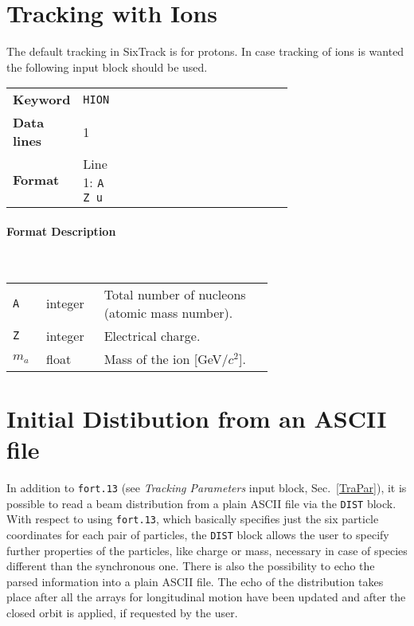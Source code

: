 \section{Tracking with Ions} \label{hions}
The default tracking in SixTrack is for protons. In case tracking of ions is wanted the following input block should be used.

\bigskip
\begin{tabular}{@{}llp{0.7\linewidth}}
    \textbf{Keyword}    & \texttt{HION}\index{HION} \\
    \textbf{Data lines} & 1 \\
    \textbf{Format}     & Line 1: \texttt{A Z u}
\end{tabular}

\paragraph{Format Description}~

\bigskip
\begin{longtabu}{@{}llp{0.65\linewidth}}
    \texttt{A}   & integer & Total number of nucleons (atomic mass number). \\
    \texttt{Z}   & integer & Electrical charge. \\
    \texttt{$m_a$}   & float   & Mass of the ion [GeV/$c^2$]. 
\end{longtabu}

\section{Initial Distibution from an ASCII file} \label{distBlock}
In addition to \texttt{fort.13} (see \emph{Tracking Parameters} input block, Sec.~\ref{TraPar}), it is possible to read a beam distribution from a plain ASCII file via the \texttt{DIST} block.
With respect to using \texttt{fort.13}, which basically specifies just the six particle coordinates for each pair of particles, the \texttt{DIST} block allows the user to specify further properties of the particles, like charge or mass, necessary in case of species different than the synchronous one.
There is also the possibility to echo the parsed information into a plain ASCII file.
The echo of the distribution takes place after all the arrays for longitudinal motion have been updated and after the closed orbit is applied, if requested by the user.

